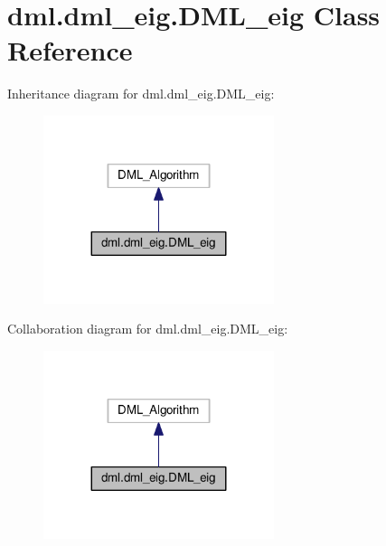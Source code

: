 \hypertarget{classdml_1_1dml__eig_1_1DML__eig}{}\section{dml.\+dml\+\_\+eig.\+D\+M\+L\+\_\+eig Class Reference}
\label{classdml_1_1dml__eig_1_1DML__eig}


Inheritance diagram for dml.\+dml\+\_\+eig.\+D\+M\+L\+\_\+eig\+:
\nopagebreak
\begin{figure}[H]
\begin{center}
\leavevmode
\includegraphics[width=191pt]{classdml_1_1dml__eig_1_1DML__eig__inherit__graph}
\end{center}
\end{figure}


Collaboration diagram for dml.\+dml\+\_\+eig.\+D\+M\+L\+\_\+eig\+:
\nopagebreak
\begin{figure}[H]
\begin{center}
\leavevmode
\includegraphics[width=191pt]{classdml_1_1dml__eig_1_1DML__eig__coll__graph}
\end{center}
\end{figure}
